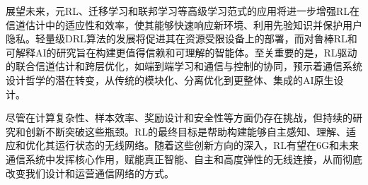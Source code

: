 \documentclass[journal]{IEEEtran}
\begin{document}
展望未来，元RL、迁移学习和联邦学习等高级学习范式的应用将进一步增强RL在信道估计中的适应性和效率，使其能够快速响应新环境、利用先验知识并保护用户隐私\cite{ref48}。轻量级DRL算法的发展将促进其在资源受限设备上的部署，而对鲁棒RL和可解释AI的研究旨在构建更值得信赖和可理解的智能体\cite{ref5}。至关重要的是，RL驱动的联合信道估计和跨层优化，如端到端学习和通信与控制的协同，预示着通信系统设计哲学的潜在转变，从传统的模块化、分离优化到更整体、集成的AI原生设计\cite{ref10}。

尽管在计算复杂性、样本效率、奖励设计和安全性等方面仍存在挑战，但持续的研究和创新不断突破这些瓶颈。RL的最终目标是帮助构建能够自主感知、理解、适应和优化其运行状态的无线网络。随着这些创新方向的深入，RL有望在6G和未来通信系统中发挥核心作用，赋能真正智能、自主和高度弹性的无线连接，从而彻底改变我们设计和运营通信网络的方式。



\end{document}

